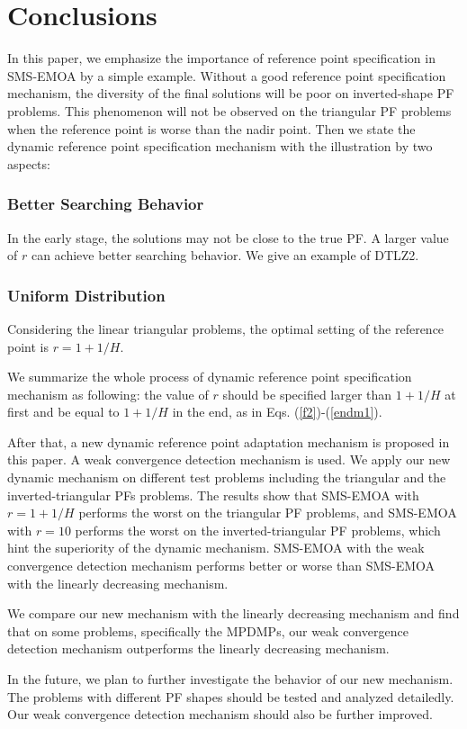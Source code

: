 \documentclass[conference]{IEEEtran}
\begin{document}
\section{Conclusions}
In this paper, we emphasize the importance of reference point specification  
in SMS-EMOA by a simple example. 
Without a good reference point specification mechanism, the diversity of the final solutions will be poor
on inverted-shape PF problems. 
This phenomenon will not be observed on the triangular PF problems when the reference point is worse than the nadir point. 
Then we state the dynamic reference point specification mechanism with the illustration by two aspects:
\subsubsection{Better Searching Behavior} In the early stage, 
the solutions may not be close to the true PF. 
A larger value of $r$ can achieve better searching behavior.
We give an example of DTLZ2. 
\subsubsection{Uniform Distribution} Considering the linear triangular problems, 
the optimal setting of the reference point is $r=1+1/H$. 

We summarize the whole process of dynamic reference point specification mechanism as following: 
the value of $r$ should be specified larger than $1+1/H$ at first and be equal to $1+1/H$ in the end,
as in Eqs. (\ref{f2})-(\ref{endm1}).

After that, a new dynamic reference point adaptation mechanism is proposed in this paper.
A weak convergence detection mechanism is used. 
We apply our new dynamic mechanism on different test problems including the triangular and the inverted-triangular PFs problems. 
The results show that SMS-EMOA with $r=1+1/H$ performs the worst on the triangular PF problems, 
and SMS-EMOA with $r=10$ performs the worst on the inverted-triangular PF problems,
which hint the superiority of the dynamic mechanism. 
SMS-EMOA with the weak convergence detection mechanism performs better or worse than SMS-EMOA with the linearly decreasing mechanism.

We compare our new mechanism with the linearly decreasing mechanism and find that
on some problems, specifically the MPDMPs, 
our weak convergence detection mechanism outperforms the linearly decreasing mechanism. 

In the future, we plan to further investigate the behavior of our new mechanism. 
The problems with different PF shapes should be tested and analyzed detailedly. 
Our weak convergence detection mechanism should also be further improved. 

 
 
\end{document}
